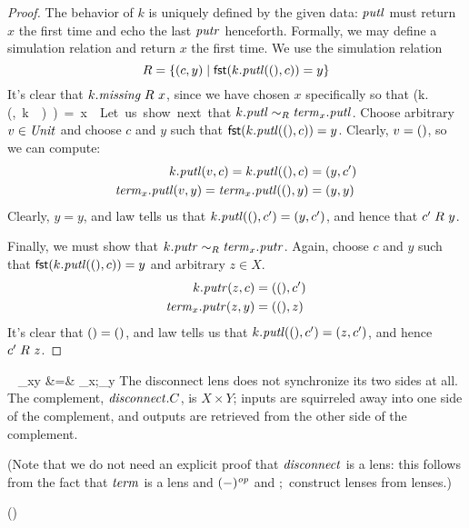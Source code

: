 \begin{defn}[$R$-similarity]
\begin{theorem}
\begin{lemma}
\iffull
\begin{proof}
The behavior of $k$ is uniquely defined by the given data: $\mathit{putl}$ must return $x$ the first time and echo the last $\mathit{putr}$ henceforth. Formally, we may define a simulation relation and return $x$ the first time.
We use the simulation relation 
\[
R = \{(c,y)\mid \mathsf{fst}(k.\mathit{putl}({()},c))=y\}
\]
It's clear that $k.\mathit{missing} \mathrel{R_{}} x$, since we have chosen $x$ specifically
so that \dissdis\mlfst(k.\putl(\unit,k.\missing))=x.\dissdis

Let us show next that $k.\mathit{putl} \sim_R \mathit{term}_x.\mathit{putl}$. Choose arbitrary
$v\in\mathit{Unit}$ and choose $c$ and $y$ such that $\mathsf{fst}(k.\mathit{putl}({()},c))=y$.
Clearly,
$v={()}$, so we can compute:
\begin{align*}
    k.\mathit{putl}(v,c) = k.\mathit{putl}({()},c) &= (y,c') \\
    \mathit{term}_x.\mathit{putl}(v,y) = \mathit{term}_x.\mathit{putl}({()},y) &= (y,y)
\end{align*}
Clearly, $y=y$, and law  tells us that $k.\mathit{putl}({()},c')=(y,c')$,
and hence that $c' \mathrel{R_{}} y$.

Finally, we must show that $k.\mathit{putr} \sim_R \mathit{term}_x.\mathit{putr}$. Again, choose
$c$ and $y$ such that $\mathsf{fst}(k.\mathit{putl}({()},c))=y$ and arbitrary $z \in X$.
\begin{align*}
    k.\mathit{putr}(z,c) &= ({()},c') \\
    \mathit{term}_x.\mathit{putr}(z,y) &= ({()},z)
\end{align*}
It's clear that ${()}={()}$, and law  tells us that
$k.\mathit{putl}({()},c') = (z,c')$, and hence $c' \mathrel{R_{}} z$.
\end{proof}
\fi

\iffull\clearpage\fi

\begin{defn}\ 
{}
{\disconnect_{xy} &=& \const_x;\const_y\op}
The disconnect lens does not synchronize its two sides at all. The
complement, $\mathit{disconnect}.C$, is $X \times Y$; inputs are squirreled away into
one side of the complement, and outputs are retrieved
from the other side of the complement.
\end{defn}

\iffull (Note that we do not need an explicit proof that $\mathit{disconnect}$ is a
lens: this follows from the fact that $\mathit{term}$ is a lens and $(-)^\mathit{op}$ and
$;$ construct lenses from lenses.)  \fi

\iflater
()
\fi


\end{lemma}
\end{theorem}
\end{defn}
